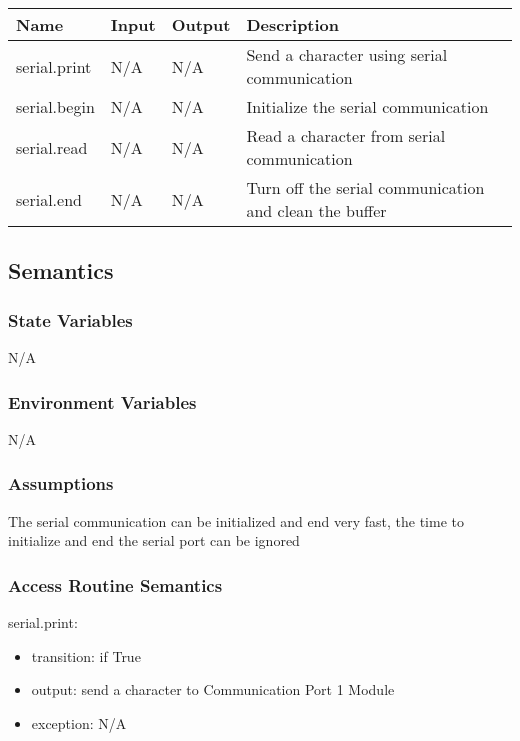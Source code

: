 \documentclass[12pt, titlepage]{article}
\begin{document}
\begin{center}
\begin{tabular}{|p{2cm}|p{2.5cm}|l|p{7.5cm}|}
\hline
\textbf{Name} & \textbf{Input} & \textbf{Output} & \textbf{Description}\\
\hline
serial.print & N/A & N/A & Send a character using serial communication\\
\hline
serial.begin& N/A & N/A & Initialize the serial communication\\
\hline
serial.read& N/A & N/A & Read a character from serial communication \\
\hline
serial.end& N/A & N/A & Turn off the serial communication and clean the buffer\\
\hline



\end{tabular}
\end{center}

\subsection{Semantics}

\subsubsection{State Variables}

N/A

\subsubsection{Environment Variables}

N/A

\subsubsection{Assumptions}

The serial communication can be initialized and end very fast, the time to initialize and end the serial port can be ignored

\subsubsection{Access Routine Semantics}


\noindent serial.print:
\begin{itemize}
\item transition: if True  
\item output: send a character to Communication Port 1 Module 
\item exception: N/A 
\end{itemize}
\end{document}
